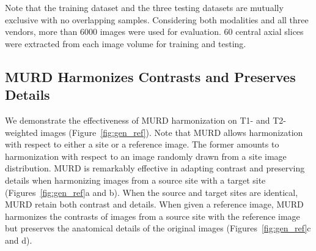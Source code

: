 \documentclass{nature}
\begin{document}
\vspace{-\baselineskip}
Note that the training dataset and the three testing datasets are mutually exclusive with no overlapping samples. 
Considering both modalities and all three vendors, more than 6000 images were used for evaluation. 60 central axial slices were extracted from each image volume for training and testing.

\subsection{MURD Harmonizes Contrasts and Preserves Details}
We demonstrate the effectiveness of MURD harmonization on
T1- and T2-weighted images (Figure~\ref{fig:gen_ref}). Note that MURD allows harmonization with respect to either a site
or a reference image. The former amounts to harmonization with respect to an image randomly drawn from a site image distribution. 
MURD is remarkably effective in adapting contrast and preserving details when harmonizing images from a source site with a target site (Figures~\ref{fig:gen_ref}a and b).
When the source and target sites are identical, MURD retain both contrast and details.
When given a reference image, MURD harmonizes the contrasts of images from a source site with the reference image but preserves the anatomical details of the original images (Figures~\ref{fig:gen_ref}c and d).
\end{document}
